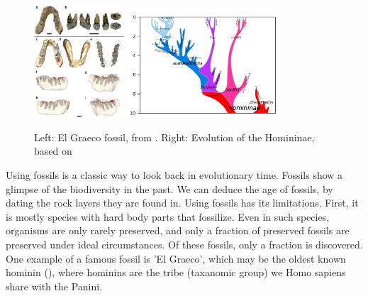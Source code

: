 \begin{figure}[H]
  \includegraphics[width=0.3\textwidth]{Graecopithecus.jpg}
  \includegraphics[width=0.5\textwidth]{Hominini_lineage.png}
  \caption{
    Left: El Graeco fossil, from \cite{fuss2017potential}.
    Right: Evolution of the Homininae, based on \cite{stringer2012makes}
 }
  \label{fig:human_evolution}
\end{figure}

Using fossils is a classic way to look back in evolutionary time.
Fossils show a glimpse of the biodiversity in the past.
We can deduce the age of fossils, by dating the rock layers they are found in.
Using fossils has its limitations. First, it is mostly species with hard body
parts that fossilize. Even in such species, organisms are 
only rarely preserved, and only a fraction of preserved fossils are preserved under ideal circumstances. Of 
these fossils, only a fraction is discovered.
One example of a famous fossil is 'El Graeco', 
which may be the oldest known hominin (\cite{fuss2017potential}), where
hominins are the tribe (taxanomic group) we Homo sapiens share with the Panini.

